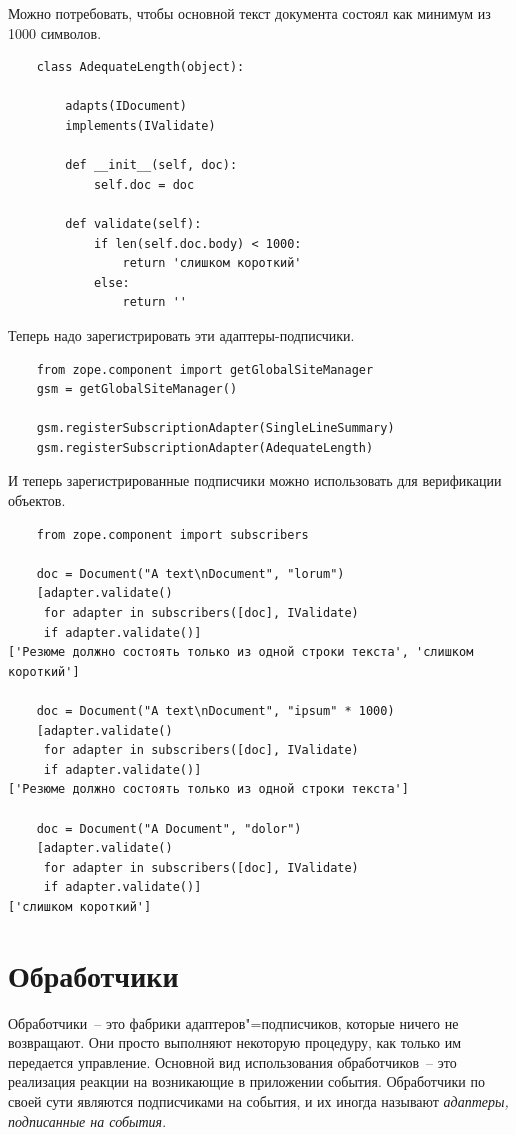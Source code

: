 \documentclass[a4paper,openany,twoside,final]{book}
\providecommand*{\DUroletitlereference}[1]{\textsl{#1}}
\begin{document}
Можно потребовать, чтобы основной текст документа состоял как минимум
из 1000 символов.

\begin{verbatim}
    class AdequateLength(object):

        adapts(IDocument)
        implements(IValidate)

        def __init__(self, doc):
            self.doc = doc

        def validate(self):
            if len(self.doc.body) < 1000:
                return 'слишком короткий'
            else:
                return ''
\end{verbatim}

Теперь надо зарегистрировать эти адаптеры-подписчики.

\begin{verbatim}
    from zope.component import getGlobalSiteManager
    gsm = getGlobalSiteManager()

    gsm.registerSubscriptionAdapter(SingleLineSummary)
    gsm.registerSubscriptionAdapter(AdequateLength)
\end{verbatim}

И теперь зарегистрированные подписчики можно использовать для верификации объектов.

\begin{verbatim}
    from zope.component import subscribers

    doc = Document("A text\nDocument", "lorum")
    [adapter.validate()
     for adapter in subscribers([doc], IValidate)
     if adapter.validate()]
['Резюме должно состоять только из одной строки текста', 'слишком короткий']

    doc = Document("A text\nDocument", "ipsum" * 1000)
    [adapter.validate()
     for adapter in subscribers([doc], IValidate)
     if adapter.validate()]
['Резюме должно состоять только из одной строки текста']

    doc = Document("A Document", "dolor")
    [adapter.validate()
     for adapter in subscribers([doc], IValidate)
     if adapter.validate()]
['слишком короткий']
\end{verbatim}


\section{Обработчики%
  \label{id47}%
}

Обработчики~-- это фабрики адаптеров"=подписчиков, которые ничего не возвращают.  Они просто выполняют некоторую процедуру, как только им передается управление.  Основной вид использования обработчиков~-- это реализация реакции на возникающие в приложении события.  Обработчики по своей сути являются подписчиками на события, и их иногда называют \DUroletitlereference{адаптеры, подписанные на события}.
\end{document}
